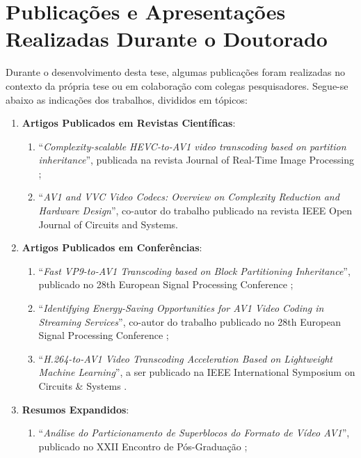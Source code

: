 \chapter{Publicações e Apresentações Realizadas Durante o Doutorado}
\label{apx:C}

Durante o desenvolvimento desta tese, algumas publicações foram realizadas no contexto da própria tese ou em colaboração com colegas pesquisadores. Segue-se abaixo as indicações dos trabalhos, divididos em tópicos:

\begin{enumerate}
     \item \textbf{Artigos Publicados em Revistas Científicas}:
    \begin{enumerate}
        \item ``\textit{Complexity-scalable HEVC-to-AV1 video transcoding based on partition inheritance}'', publicada na revista Journal of Real-Time Image Processing \cite{bib:borges2_2021};

        \item ``\textit{AV1 and VVC Video Codecs: Overview on Complexity Reduction and Hardware Design}'', co-autor do trabalho publicado na revista IEEE Open Journal of Circuits and Systems.
    \end{enumerate}
    
    \item \textbf{Artigos Publicados em Conferências}:
    \begin{enumerate}
        \item ``\textit{Fast VP9-to-AV1 Transcoding based on Block Partitioning Inheritance}'', publicado no 28th European Signal Processing Conference \cite{bib:borges_2021};

        \item ``\textit{Identifying Energy-Saving Opportunities for AV1 Video Coding in Streaming Services}'', co-autor do trabalho publicado no 28th European Signal Processing Conference \cite{bib:camargo_2022};

        \item ``\textit{H.264-to-AV1 Video Transcoding Acceleration Based on Lightweight Machine Learning}'', a ser publicado na IEEE International Symposium on Circuits \& Systems \cite{bib:borges_iscas_2023}.
    \end{enumerate}
    
    \item \textbf{Resumos Expandidos}:
    \begin{enumerate}
        \item ``\textit{Análise do Particionamento de Superblocos do Formato de Vídeo AV1}'', publicado no XXII Encontro de Pós-Graduação \cite{bib:enpos_2020};


\end{enumerate}
\end{enumerate}
